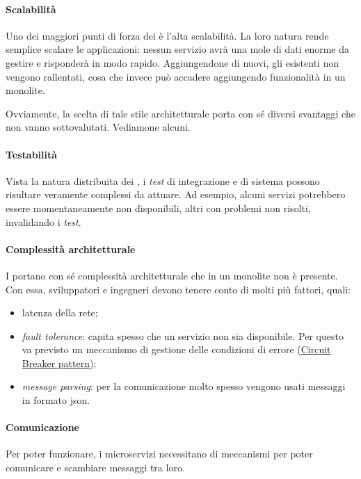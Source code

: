 \paragraph*{Scalabilità} Uno dei maggiori punti di forza dei  è l'alta scalabilità. La loro natura rende semplice scalare le
applicazioni: nessun servizio avrà una mole di dati enorme da gestire e risponderà in modo rapido. Aggiungendone di nuovi, gli esistenti non vengono rallentati, cosa che invece può accadere aggiungendo funzionalità in un monolite.

\bigskip

Ovviamente, la scelta di tale stile architetturale porta con sé diversi svantaggi che non vanno sottovalutati. Vediamone alcuni.

\paragraph*{Testabilità} Vista la natura distribuita dei , i \textit{test} di integrazione e di sistema possono risultare veramente complessi
da attuare. Ad esempio, alcuni servizi potrebbero essere momentaneamente non disponibili, altri con problemi non risolti, invalidando i \textit{test}.

\paragraph*{Complessità architetturale} I  portano con sé complessità architetturale che in un monolite non è presente.
Con essa, sviluppatori e ingegneri devono tenere conto di molti più fattori, quali:
\begin{itemize}
	\item latenza della rete;
	\item \textit{fault tolerance}: capita spesso che un servizio non sia disponibile. Per questo va previsto un meccanismo di gestione delle
	condizioni di errore (\hyperref[circuit-breaker]{Circuit Breaker pattern});
	\item \textit{message parsing}: per la comunicazione molto spesso vengono usati messaggi in formato \acrshort{json}.
\end{itemize}

\paragraph*{Comunicazione} Per poter funzionare, i microservizi necessitano di meccanismi per poter comunicare e scambiare messaggi tra loro.

